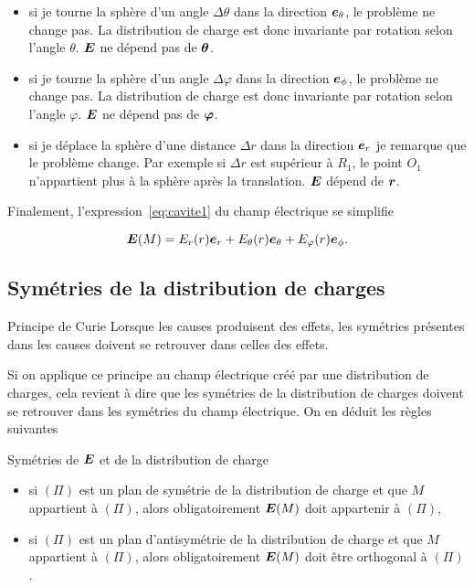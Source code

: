\begin{itemize}
	\item  si je tourne la sphère d'un angle $\Delta \theta$ dans la
	  direction $\etheta$, le problème
	  ne change pas. La distribution de charge est donc invariante 
	  par rotation selon l'angle $\theta$. $\vece$ ne dépend pas de
	  $\mitbf{\theta}$.

	  \item  si je tourne la sphère d'un angle $\Delta \varphi$ dans la
	  direction $\ephi$, le problème
	  ne change pas. La distribution de charge est donc invariante 
	  par rotation selon l'angle $\varphi$. $\vece$ ne dépend pas de
	  $\mitbf{\varphi}$.
  	\item si je déplace la sphère d'une distance $\Delta r$ dans la direction
	$\er$ je remarque que le problème change. Par exemple si $\Delta r$ 
	est supérieur à $R_1$, le point $O_1$ n'appartient plus à la sphère après
	la translation. $\vece$ dépend de $\mitbf{r}$.

\end{itemize}

Finalement, l'expression~\ref{eq:cavite1} du champ électrique se simplifie

\begin{equation}
	\vece(M) = E_r(r)\er + E_\theta(r)\etheta + E_\varphi(r)\ephi.
\end{equation}
\subsection{Symétries de la distribution de charges}

\begin{defn}{Principe de Curie}
	Lorsque les causes produisent des effets, les symétries présentes dans les
	causes doivent se retrouver dans celles des effets.
\end{defn}

Si on applique ce principe au champ électrique créé par une distribution 
de charges, cela revient à dire que les symétries de la distribution de 
charges doivent se retrouver dans les symétries du champ électrique. On en 
déduit les règles suivantes

\begin{defn}{Symétries de $\vece$ et de la distribution de charge}
  \begin{itemize}
  \item si $(\Pi)$ est un plan de symétrie de la distribution de charge et que 
    $M$ appartient à $(\Pi)$, alors obligatoirement $\vece(M)$ doit 
    appartenir à $(\Pi)$,
  \item si $(\Pi)$ est un plan d'antisymétrie de la distribution de charge 
    et que $M$ appartient à $(\Pi)$, alors obligatoirement $\vece(M)$ doit 
    être orthogonal à $(\Pi)$.
  \end{itemize}
\end{defn}

